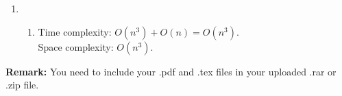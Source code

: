 \documentclass[12pt,a4paper]{article}
\makeatletter
\newtheorem*{solution}{Solution}
\theoremstyle{definition}
\renewenvironment{solution}[1][Solution] {\par\pushQED{\qed}\normalfont\topsep6\p@\@plus6\p@\relax\trivlist\item[\hskip\labelsep\bfseries#1\@addpunct{.}]\ignorespaces}{\popQED\endtrivlist\@endpefalse} \makeatother
\makeatother
\begin{document}
\begin{enumerate}
\begin{solution}
\begin{enumerate}[label = (\alph*)]
\begin{minipage}[t]{0.9\textwidth}
\begin{algorithm}[H]
				\end{algorithm}
			\end{minipage}
			\item
			Time complexity: $O(n^3) + O(n) = O(n^3)$. \\
			Space complexity: $O(n^3)$.
		\end{enumerate}
	\end{solution}
\end{enumerate}

\vspace{20pt}

\textbf{Remark:} You need to include your .pdf and .tex files in your uploaded .rar or .zip file.

\end{document}
